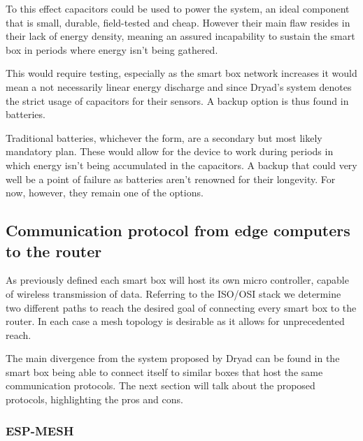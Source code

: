 \documentclass[11pt]{article}
\begin{document}
To this effect capacitors could be used to power the system, an ideal component that is small, durable, field-tested and cheap. However their main flaw resides in their lack of energy density, meaning an assured incapability to sustain the smart box in periods where energy isn't being gathered. \par 
\vspace{0.5 cm}

This would require testing, especially as the smart box network increases it would mean a not necessarily linear energy discharge and since Dryad's system denotes the strict usage of capacitors for their sensors. A backup option is thus found in batteries. \par
\vspace{0.5 cm}

Traditional batteries, whichever the form, are a secondary but most likely mandatory plan. These would allow for the device to work during periods in which energy isn't being accumulated in the capacitors. A backup that could very well be a point of failure as batteries aren't renowned for their longevity. For now, however, they remain one of the options.\par
\vspace{0.5 cm}

\subsection{Communication protocol from edge computers to the router}

As previously defined each smart box will host its own micro controller, capable of wireless transmission of data. Referring to the ISO/OSI stack we determine two different paths to reach the desired goal of connecting every smart box to the router. In each case a mesh topology is desirable as it allows for unprecedented reach. \par 
\vspace{0.5 cm}

The main divergence from the system proposed by Dryad can be found in the smart box being able to connect itself to similar boxes that host the same communication protocols. The next section will talk about the proposed protocols, highlighting the pros and cons. \par
\vspace{0.5 cm}

\subsubsection{ESP-MESH}
\end{document}

